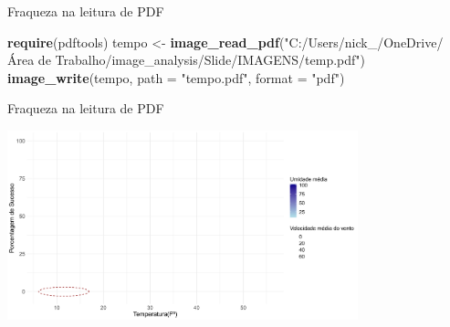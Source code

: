 \documentclass[
  ignorenonframetext,
]{beamer}
\newenvironment{Shaded}{\begin{snugshade}}{\end{snugshade}}
\newcommand{\DataTypeTok}[1]{\textcolor[rgb]{0.13,0.29,0.53}{#1}}
\newcommand{\KeywordTok}[1]{\textcolor[rgb]{0.13,0.29,0.53}{\textbf{#1}}}
\newcommand{\NormalTok}[1]{#1}
\newcommand{\StringTok}[1]{\textcolor[rgb]{0.31,0.60,0.02}{#1}}
\begin{document}
\begin{frame}[fragile]{Fraqueza na leitura de PDF}
\protect\hypertarget{fraqueza-na-leitura-de-pdf}{}

\begin{Shaded}
\begin{Highlighting}[]
\KeywordTok{require}\NormalTok{(pdftools)}
\NormalTok{tempo <-}\StringTok{ }\KeywordTok{image_read_pdf}\NormalTok{(}\StringTok{"C:/Users/nick_/OneDrive/Área de Trabalho/image_analysis/Slide/IMAGENS/temp.pdf"}\NormalTok{)}
\KeywordTok{image_write}\NormalTok{(tempo, }\DataTypeTok{path =} \StringTok{"tempo.pdf"}\NormalTok{, }\DataTypeTok{format =} \StringTok{"pdf"}\NormalTok{)}
\end{Highlighting}
\end{Shaded}

\end{frame}

\begin{frame}{Fraqueza na leitura de PDF}
\protect\hypertarget{fraqueza-na-leitura-de-pdf-1}{}

\small

\includegraphics[width=4.0in]{tempo}

\begin{center}
\tiny{}
\end{center}

\end{frame}
\end{document}
